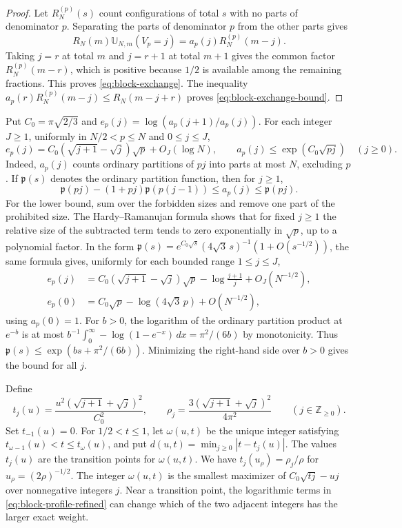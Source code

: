 \documentclass[11pt]{amsart}
\theoremstyle{remark}
\newcommand{\Z}{\mathbb Z}
\begin{document}
\begin{proof}
Let \(R_N^{(p)}(s)\) count configurations of total \(s\) with no
parts of denominator \(p\). Separating the parts of denominator \(p\)
from the other parts gives
\[
 R_N(m)\mathbb U_{N,m}(V_p=j)=a_p(j)R_N^{(p)}(m-j).
\]
Taking \(j=r\) at total \(m\) and \(j=r+1\) at total \(m+1\)
gives the common factor \(R_N^{(p)}(m-r)\), which is
positive because \(1/2\) is available among the remaining fractions. This proves
\eqref{eq:block-exchange}. The inequality
\(a_p(r)R_N^{(p)}(m-j)\le R_N(m-j+r)\) proves
\eqref{eq:block-exchange-bound}.
\end{proof}

Put \(C_0=\pi\sqrt{2/3}\) and
\(e_p(j)=\log(a_p(j+1)/a_p(j))\). For each integer \(J\ge 1\), uniformly in
\(N/2<p\le N\) and \(0\le j\le J\),
\begin{equation}
\label{eq:block-profile}
 e_p(j)=C_0(\sqrt{j+1}-\sqrt j)\sqrt p+O_J(\log N),
 \qquad
 a_p(j)\le \exp(C_0\sqrt{pj})\quad(j\ge 0).
\end{equation}
Indeed, \(a_p(j)\) counts ordinary partitions of \(pj\) into parts at most
\(N\), excluding \(p\). If \(\mathfrak p(s)\) denotes the ordinary
partition function, then for \(j\ge 1\),
\[
 \mathfrak p(pj)-(1+pj)\mathfrak p(p(j-1))
     \le a_p(j)\le \mathfrak p(pj).
\]
For the lower bound, sum over the forbidden sizes and remove one part of
the prohibited size. The Hardy--Ramanujan formula \cite{hardy-ramanujan}
shows that for fixed \(j\ge 1\) the relative size of the subtracted term
tends to zero exponentially in \(\sqrt p\), up to a polynomial factor.
In the form \(\mathfrak p(s)=e^{C_0\sqrt s}(4\sqrt3\,s)^{-1}(1+O(s^{-1/2}))\),
the same formula gives, uniformly for each bounded range \(1\le j\le J\),
\begin{align}
 e_p(j)&=C_0(\sqrt{j+1}-\sqrt j)\sqrt p-\log\frac{j+1}{j}
                 +O_J(N^{-1/2}),\label{eq:block-profile-refined}\\
 e_p(0)&=C_0\sqrt p-\log(4\sqrt3\,p)+O(N^{-1/2}),\nonumber
\end{align}
using \(a_p(0)=1\).
For \(b>0\), the logarithm of the ordinary partition product at \(e^{-b}\) is at most
\(b^{-1}\int_0^\infty-\log(1-e^{-x})\,dx=\pi^2/(6b)\) by monotonicity.
Thus \(\mathfrak p(s)\le\exp(bs+\pi^2/(6b))\). Minimizing the right-hand side
over \(b>0\) gives the bound for all \(j\).

Define
\[
 t_j(u)=\frac{u^2(\sqrt{j+1}+\sqrt j)^2}{C_0^2},
 \qquad
 \rho_j=\frac{3(\sqrt{j+1}+\sqrt j)^2}{4\pi^2}
 \qquad(j\in\Z_{\ge0}).
\]
Set \(t_{-1}(u)=0\). For \(1/2<t\le 1\), let \(\omega(u,t)\) be the
unique integer satisfying \(t_{\omega-1}(u)<t\le t_\omega(u)\), and put
\(d(u,t)=\min_{j\ge 0}|t-t_j(u)|\).
The values \(t_j(u)\) are the transition points for \(\omega(u,t)\).
We have \(t_j(u_\rho)=\rho_j/\rho\) for \(u_\rho=(2\rho)^{-1/2}\).
The integer \(\omega(u,t)\) is the smallest maximizer of
\(C_0\sqrt{tj}-uj\) over nonnegative integers \(j\).
Near a transition point, the logarithmic terms in \eqref{eq:block-profile-refined}
can change which of the two adjacent integers has the larger exact weight.
\end{document}
